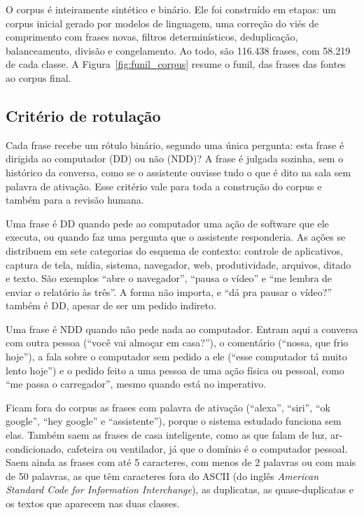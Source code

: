 \documentclass[
    12pt,                %
    openright,           %
    oneside,             %
    a4paper,             %
    english,             %
    brazil               %
]{abntex2}
\begin{document}
O corpus é inteiramente sintético e binário. Ele foi construído em etapas: um corpus inicial gerado por modelos de linguagem, uma correção do viés de comprimento com frases novas, filtros determinísticos, deduplicação, balanceamento, divisão e congelamento. Ao todo, são 116.438 frases, com 58.219 de cada classe. A Figura~\ref{fig:funil_corpus} resume o funil, das frases das fontes ao corpus final.


\subsection{Critério de rotulação}
\label{sec:rotulacao}

Cada frase recebe um rótulo binário, segundo uma única pergunta: esta frase é dirigida ao computador (DD) ou não (NDD)? A frase é julgada sozinha, sem o histórico da conversa, como se o assistente ouvisse tudo o que é dito na sala sem palavra de ativação. Esse critério vale para toda a construção do corpus e também para a revisão humana.

Uma frase é DD quando pede ao computador uma ação de software que ele executa, ou quando faz uma pergunta que o assistente responderia. As ações se distribuem em sete categorias do esquema de contexto: controle de aplicativos, captura de tela, mídia, sistema, navegador, web, produtividade, arquivos, ditado e texto. São exemplos ``abre o navegador'', ``pausa o vídeo'' e ``me lembra de enviar o relatório às três''. A forma não importa, e ``dá pra pausar o vídeo?'' também é DD, apesar de ser um pedido indireto.

Uma frase é NDD quando não pede nada ao computador. Entram aqui a conversa com outra pessoa (``você vai almoçar em casa?''), o comentário (``nossa, que frio hoje''), a fala sobre o computador sem pedido a ele (``esse computador tá muito lento hoje'') e o pedido feito a uma pessoa de uma ação física ou pessoal, como ``me passa o carregador'', mesmo quando está no imperativo.

Ficam fora do corpus as frases com palavra de ativação (``alexa'', ``siri'', ``ok google'', ``hey google'' e ``assistente''), porque o sistema estudado funciona sem elas. Também saem as frases de casa inteligente, como as que falam de luz, ar-condicionado, cafeteira ou ventilador, já que o domínio é o computador pessoal. Saem ainda as frases com até 5 caracteres, com menos de 2 palavras ou com mais de 50 palavras, as que têm caracteres fora do ASCII (do inglês \textit{American Standard Code for Information Interchange}), as duplicatas, as quase-duplicatas e os textos que aparecem nas duas classes.
\end{document}
